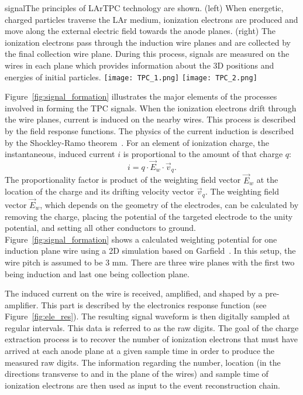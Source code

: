 \begin{cdrfigure}{signal}{The principles of LArTPC technology are shown. (left) When energetic, charged particles 
traverse the LAr medium, ionization electrons are produced and move
along the external electric field towards the anode planes. (right) The ionization
electrons pass through the induction wire planes and are  collected by the 
final collection wire plane. 
During this process, signals are measured on the wires
in each plane which provides information about the 3D positions and
energies of initial particles.}
\texttt{[image: TPC\_1.png]}
\texttt{[image: TPC\_2.png]}
\end{cdrfigure}


Figure~\ref{fig:signal_formation} illustrates the major elements of the processes 
involved in forming the TPC signals. When the ionization electrons drift through the 
wire planes, current is induced on the nearby wires. This process is described by the 
field response functions. The physics of the current induction is described by the 
Shockley-Ramo theorem~\cite{Shockley,Ramo}.  For an element of ionization charge, 
the instantaneous, induced current $i$ is proportional to the amount of that
charge $q$: 
\begin{equation}
i = q \cdot \vec{E}_{w} \cdot \vec{v}_q.
\end{equation}
The proportionality factor is product of the weighting field vector $\vec{E}_{w}$ 
at the location of the charge and its drifting velocity vector $\vec{v}_q$. 
The weighting field vector $\vec{E}_{w}$, which depends on the geometry of the electrodes, 
can be calculated by removing the charge,  placing the potential of the targeted 
electrode to the unity potential, and setting all other conductors to ground. 
Figure~\ref{fig:signal_formation} shows a calculated weighting potential for one 
induction plane wire using a 2D simulation based on Garfield~\cite{garfield}. 
In this setup, the wire pitch is assumed to be 3 mm. There are three wire planes 
with the first two being induction and last one being collection plane. 

The induced current on the wire is received, amplified, and shaped by
a pre-amplifier. This part is described by the electronics response
function (see Figure~\ref{fig:ele_res}).  
The resulting signal waveform is then digitally sampled at
regular intervals.  This data is referred to as the raw digits.  The
goal of the charge extraction process is to recover the number of
ionization electrons that must have arrived at each anode plane at a
given sample time in order to produce the measured raw digits.  The
information regarding the number, location (in the directions transverse
to and in the plane of the wires) and sample time of ionization
electrons are then used as input to the event reconstruction chain.

